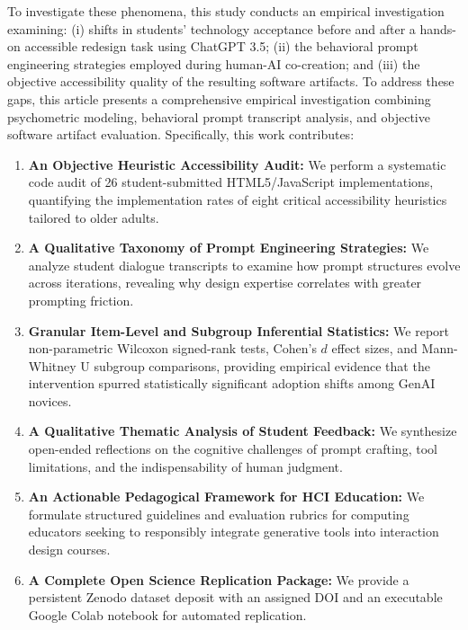 \documentclass{cleiej}
\begin{document}
To investigate these phenomena, this study conducts an empirical investigation examining: (i) shifts in students' technology acceptance before and after a hands-on accessible redesign task using ChatGPT 3.5; (ii) the behavioral prompt engineering strategies employed during human-AI co-creation; and (iii) the objective accessibility quality of the resulting software artifacts. To address these gaps, this article presents a comprehensive empirical investigation combining psychometric modeling, behavioral prompt transcript analysis, and objective software artifact evaluation. Specifically, this work contributes:
\begin{enumerate}[label=(\roman*)]
    \item \textbf{An Objective Heuristic Accessibility Audit:} We perform a systematic code audit of 26 student-submitted HTML5/JavaScript implementations, quantifying the implementation rates of eight critical accessibility heuristics tailored to older adults.
    \item \textbf{A Qualitative Taxonomy of Prompt Engineering Strategies:} We analyze student dialogue transcripts to examine how prompt structures evolve across iterations, revealing why design expertise correlates with greater prompting friction.
    \item \textbf{Granular Item-Level and Subgroup Inferential Statistics:} We report non-parametric Wilcoxon signed-rank tests, Cohen's $d$ effect sizes, and Mann-Whitney U subgroup comparisons, providing empirical evidence that the intervention spurred statistically significant adoption shifts among GenAI novices.
    \item \textbf{A Qualitative Thematic Analysis of Student Feedback:} We synthesize open-ended reflections on the cognitive challenges of prompt crafting, tool limitations, and the indispensability of human judgment.
    \item \textbf{An Actionable Pedagogical Framework for HCI Education:} We formulate structured guidelines and evaluation rubrics for computing educators seeking to responsibly integrate generative tools into interaction design courses.
    \item \textbf{A Complete Open Science Replication Package:} We provide a persistent Zenodo dataset deposit with an assigned DOI and an executable Google Colab notebook for automated replication.
\end{enumerate}
\end{document}
